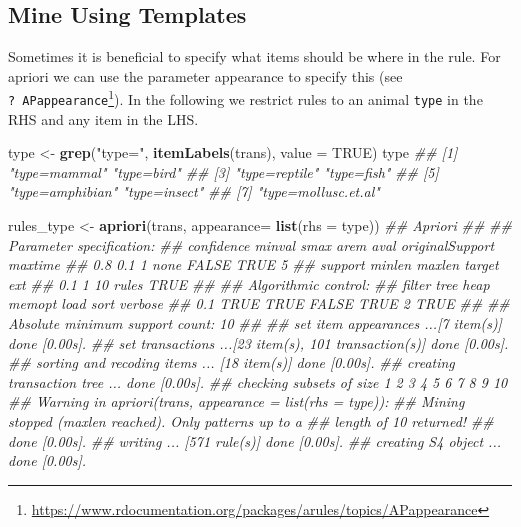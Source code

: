 \documentclass[
  notitlepage]{book}
\newenvironment{Shaded}{\begin{snugshade}}{\end{snugshade}}
\newcommand{\CommentTok}[1]{\textcolor[rgb]{0.56,0.35,0.01}{\textit{#1}}}
\newcommand{\DataTypeTok}[1]{\textcolor[rgb]{0.13,0.29,0.53}{#1}}
\newcommand{\KeywordTok}[1]{\textcolor[rgb]{0.13,0.29,0.53}{\textbf{#1}}}
\newcommand{\NormalTok}[1]{#1}
\newcommand{\OtherTok}[1]{\textcolor[rgb]{0.56,0.35,0.01}{#1}}
\newcommand{\StringTok}[1]{\textcolor[rgb]{0.31,0.60,0.02}{#1}}
\DeclareRobustCommand{\href}[2]{#2\footnote{\url{#1}}}
\begin{document}
\hypertarget{mine-using-templates}{%
\subsection{Mine Using Templates}\label{mine-using-templates}}

Sometimes it is beneficial to specify what items should be where in the
rule. For apriori we can use the parameter appearance to specify this
(see
\href{https://www.rdocumentation.org/packages/arules/topics/APappearance}{\texttt{?\ APappearance}}).
In the following we restrict rules to an animal \texttt{type} in the RHS and
any item in the LHS.

\begin{Shaded}
\begin{Highlighting}[]
\NormalTok{type \textless{}{-}}\StringTok{ }\KeywordTok{grep}\NormalTok{(}\StringTok{"type="}\NormalTok{, }\KeywordTok{itemLabels}\NormalTok{(trans), }\DataTypeTok{value =} \OtherTok{TRUE}\NormalTok{)}
\NormalTok{type}
\CommentTok{\#\# [1] "type=mammal"        "type=bird"         }
\CommentTok{\#\# [3] "type=reptile"       "type=fish"         }
\CommentTok{\#\# [5] "type=amphibian"     "type=insect"       }
\CommentTok{\#\# [7] "type=mollusc.et.al"}
\end{Highlighting}
\end{Shaded}

\begin{Shaded}
\begin{Highlighting}[]
\NormalTok{rules\_type \textless{}{-}}\StringTok{ }\KeywordTok{apriori}\NormalTok{(trans, }\DataTypeTok{appearance=} \KeywordTok{list}\NormalTok{(}\DataTypeTok{rhs =}\NormalTok{ type))}
\CommentTok{\#\# Apriori}
\CommentTok{\#\# }
\CommentTok{\#\# Parameter specification:}
\CommentTok{\#\#  confidence minval smax arem  aval originalSupport maxtime}
\CommentTok{\#\#         0.8    0.1    1 none FALSE            TRUE       5}
\CommentTok{\#\#  support minlen maxlen target  ext}
\CommentTok{\#\#      0.1      1     10  rules TRUE}
\CommentTok{\#\# }
\CommentTok{\#\# Algorithmic control:}
\CommentTok{\#\#  filter tree heap memopt load sort verbose}
\CommentTok{\#\#     0.1 TRUE TRUE  FALSE TRUE    2    TRUE}
\CommentTok{\#\# }
\CommentTok{\#\# Absolute minimum support count: 10 }
\CommentTok{\#\# }
\CommentTok{\#\# set item appearances ...[7 item(s)] done [0.00s].}
\CommentTok{\#\# set transactions ...[23 item(s), 101 transaction(s)] done [0.00s].}
\CommentTok{\#\# sorting and recoding items ... [18 item(s)] done [0.00s].}
\CommentTok{\#\# creating transaction tree ... done [0.00s].}
\CommentTok{\#\# checking subsets of size 1 2 3 4 5 6 7 8 9 10}
\CommentTok{\#\# Warning in apriori(trans, appearance = list(rhs = type)):}
\CommentTok{\#\# Mining stopped (maxlen reached). Only patterns up to a}
\CommentTok{\#\# length of 10 returned!}
\CommentTok{\#\#  done [0.00s].}
\CommentTok{\#\# writing ... [571 rule(s)] done [0.00s].}
\CommentTok{\#\# creating S4 object  ... done [0.00s].}
\end{Highlighting}
\end{Shaded}
\end{document}
